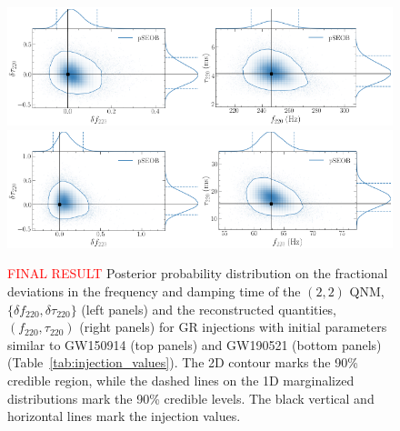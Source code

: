 \documentclass[twocolumn,prd,aps,superscriptaddress,preprintnumbers,tightenlines,showpacs,nofootinbib,eqsecnum,amsfonts,amsmath]{revtex4-1}
\newcommand{\df}[1]{\delta f_{\text{#1}}}
\newcommand{\dtau}[1]{\delta \tau_{\text{#1}}}
\newcommand{\fngr}[1]{f_{\text{#1}}}
\newcommand{\taungr}[1]{\tau_{\text{#1}}}
\begin{document}
\begin{figure}%
\begin{center}
	\includegraphics[width=0.5\textwidth]{figures/GW150914_simulated_signal_0p0_deltaf220_deltatau220.png}\includegraphics[width=0.5\textwidth]{figures/GW150914_simulated_signal_0p0_f220_tau220.png}	
	\includegraphics[width=0.5\textwidth]{figures/GW190521_simulated_signal_0p0_deltaf220_deltatau220.png}\includegraphics[width=0.5\textwidth]{figures/GW190521_simulated_signal_0p0_f220_tau220.png}		
	\caption{\textcolor{red}{FINAL RESULT} Posterior probability distribution on the fractional deviations in the frequency and damping time of the $(2,2)$ QNM, $\{\df{220},\dtau{220}\}$ (left panels) and the reconstructed quantities, $(\fngr{220}, \taungr{220})$ (right panels) for GR injections with initial parameters similar to GW150914 (top panels) and GW190521 (bottom panels) (Table~\ref{tab:injection_values}). The 2D contour marks the 90\% credible region, while the dashed lines on the 1D marginalized distributions mark the 90\% credible levels. The black vertical and horizontal lines mark the injection values.}
	\label{fig:simulated_signal_GR}
\end{center}
\end{figure}
\end{document}
